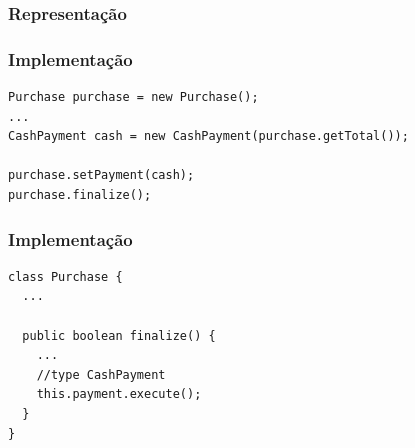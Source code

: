 \begin{frame}
\frametitle{Representação}
\end{frame}

\begin{frame}[fragile]
\frametitle{Implementação}
\begin{lstlisting}
Purchase purchase = new Purchase();
...
CashPayment cash = new CashPayment(purchase.getTotal());

purchase.setPayment(cash);
purchase.finalize();
\end{lstlisting}
\end{frame}

\begin{frame}[fragile]
\frametitle{Implementação}
\begin{lstlisting}
class Purchase {
  ...

  public boolean finalize() {
    ...
    //type CashPayment
    this.payment.execute();
  }
}
\end{lstlisting}
\end{frame}

